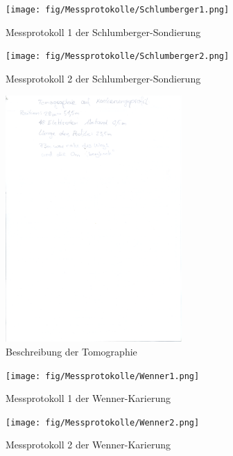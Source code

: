 


\begin{figure}[h]
\centering
\texttt{[image: fig/Messprotokolle/Schlumberger1.png]}
\caption{Messprotokoll 1 der Schlumberger-Sondierung}
\label{abb:Schlumberger1}
\end{figure}

\begin{figure}[h]
\centering
\texttt{[image: fig/Messprotokolle/Schlumberger2.png]}
\caption{Messprotokoll 2 der Schlumberger-Sondierung}
\label{abb:Schlumberger2}
\end{figure}

\begin{figure}[h]
\centering
\includegraphics[width=0.6\textwidth]{fig/Messprotokolle/Tomographie.png}
\caption{Beschreibung der Tomographie}
\label{abb:AnhTomographie}
\end{figure}

\begin{figure}[h]
\centering
\texttt{[image: fig/Messprotokolle/Wenner1.png]}
\caption{Messprotokoll 1 der Wenner-Karierung}
\label{abb:Wenner1}
\end{figure}

\begin{figure}[h]
\centering
\texttt{[image: fig/Messprotokolle/Wenner2.png]}
\caption{Messprotokoll 2 der Wenner-Karierung}
\label{abb:Wenner2}
\end{figure}
